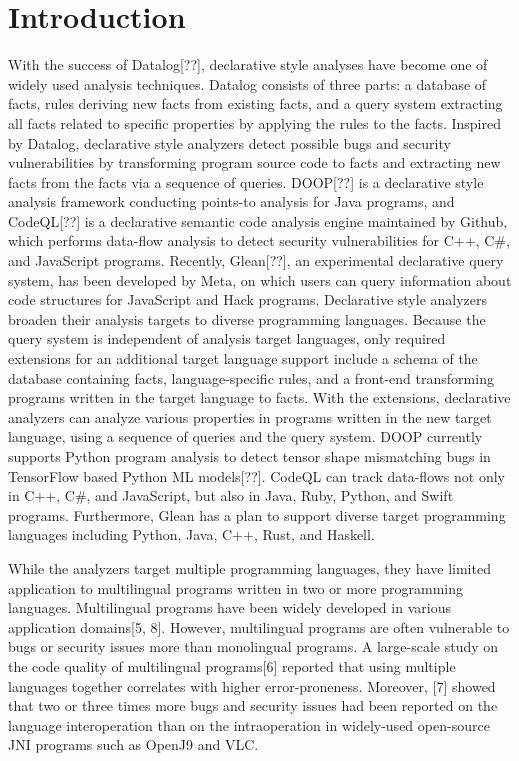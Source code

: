 \section{Introduction}
With the success of Datalog[??], declarative style analyses have become one of
widely used analysis techniques. Datalog consists of three parts: a database of
facts, rules deriving new facts from existing facts, and a query system
extracting all facts related to specific properties by applying the rules to
the facts. Inspired by Datalog, declarative style analyzers detect possible
bugs and security vulnerabilities by transforming program source code to facts
and extracting new facts from the facts via a sequence of queries. DOOP[??] is
a declarative style analysis framework conducting points-to analysis for Java
programs, and CodeQL[??] is a declarative semantic code analysis engine
maintained by Github, which performs data-flow analysis to detect security
vulnerabilities for C++, C\#, and JavaScript programs. Recently, Glean[??], an
experimental declarative query system, has been developed by Meta, on which
users can query information about code structures for JavaScript and Hack
programs.  Declarative style analyzers broaden their analysis targets to
diverse programming languages. Because the query system is independent of
analysis target languages, only required extensions for an additional target
language support include a schema of the database containing facts,
language-specific rules, and a front-end transforming programs written in the
target language to facts. With the extensions, declarative analyzers can
analyze various properties in programs written in the new target language,
using a sequence of queries and the query system.  DOOP currently supports
Python program analysis to detect tensor shape mismatching bugs in TensorFlow
based Python ML models[??]. CodeQL can track data-flows not only in C++, C\#,
and JavaScript, but also in Java, Ruby, Python, and Swift programs.
Furthermore, Glean has a plan to support diverse target programming languages
including Python, Java, C++, Rust, and Haskell.

While the analyzers target multiple programming languages, they have limited
application to multilingual programs written in two or more programming
languages. Multilingual programs have been widely developed in various
application domains[5, 8]. However, multilingual programs are often vulnerable
to bugs or security issues more than monolingual programs. A large-scale study
on the code quality of multilingual programs[6] reported that using multiple
languages together correlates with higher error-proneness. Moreover, [7] showed
that two or three times more bugs and security issues had been reported on the
language interoperation than on the intraoperation in widely-used open-source
JNI programs such as OpenJ9 and VLC.

